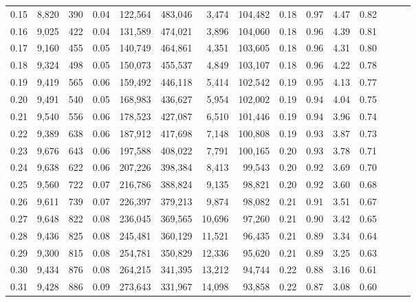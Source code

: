 \begin{tabular}{rrrrrrrrrrrrrrr}
0.15 &   8,820 &    390 &  0.04 &  122,564 &  483,046 &    3,474 &  104,482 &  0.18 &  0.97 &  4.47 &      0.82 \\
0.16 &   9,025 &    422 &  0.04 &  131,589 &  474,021 &    3,896 &  104,060 &  0.18 &  0.96 &  4.39 &      0.81 \\
0.17 &   9,160 &    455 &  0.05 &  140,749 &  464,861 &    4,351 &  103,605 &  0.18 &  0.96 &  4.31 &      0.80 \\
0.18 &   9,324 &    498 &  0.05 &  150,073 &  455,537 &    4,849 &  103,107 &  0.18 &  0.96 &  4.22 &      0.78 \\
0.19 &   9,419 &    565 &  0.06 &  159,492 &  446,118 &    5,414 &  102,542 &  0.19 &  0.95 &  4.13 &      0.77 \\
0.20 &   9,491 &    540 &  0.05 &  168,983 &  436,627 &    5,954 &  102,002 &  0.19 &  0.94 &  4.04 &      0.75 \\
0.21 &   9,540 &    556 &  0.06 &  178,523 &  427,087 &    6,510 &  101,446 &  0.19 &  0.94 &  3.96 &      0.74 \\
0.22 &   9,389 &    638 &  0.06 &  187,912 &  417,698 &    7,148 &  100,808 &  0.19 &  0.93 &  3.87 &      0.73 \\
0.23 &   9,676 &    643 &  0.06 &  197,588 &  408,022 &    7,791 &  100,165 &  0.20 &  0.93 &  3.78 &      0.71 \\
0.24 &   9,638 &    622 &  0.06 &  207,226 &  398,384 &    8,413 &   99,543 &  0.20 &  0.92 &  3.69 &      0.70 \\
0.25 &   9,560 &    722 &  0.07 &  216,786 &  388,824 &    9,135 &   98,821 &  0.20 &  0.92 &  3.60 &      0.68 \\
0.26 &   9,611 &    739 &  0.07 &  226,397 &  379,213 &    9,874 &   98,082 &  0.21 &  0.91 &  3.51 &      0.67 \\
0.27 &   9,648 &    822 &  0.08 &  236,045 &  369,565 &   10,696 &   97,260 &  0.21 &  0.90 &  3.42 &      0.65 \\
0.28 &   9,436 &    825 &  0.08 &  245,481 &  360,129 &   11,521 &   96,435 &  0.21 &  0.89 &  3.34 &      0.64 \\
0.29 &   9,300 &    815 &  0.08 &  254,781 &  350,829 &   12,336 &   95,620 &  0.21 &  0.89 &  3.25 &      0.63 \\
0.30 &   9,434 &    876 &  0.08 &  264,215 &  341,395 &   13,212 &   94,744 &  0.22 &  0.88 &  3.16 &      0.61 \\
0.31 &   9,428 &    886 &  0.09 &  273,643 &  331,967 &   14,098 &   93,858 &  0.22 &  0.87 &  3.08 &      0.60 \\

\end{tabular}

